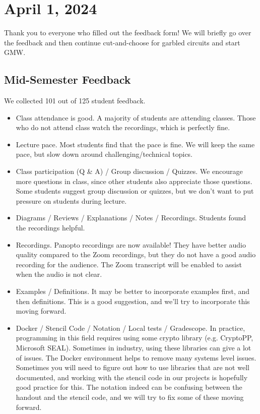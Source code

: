\section{April 1, 2024}
\label{20240401}

Thank you to everyone who filled out the feedback form! We will briefly go over the feedback and then continue cut-and-choose for garbled circuits and start GMW.

\subsection{Mid-Semester Feedback}

We collected 101 out of 125 student feedback.

\begin{itemize}
    \item Class attendance is good. A majority of students are attending classes. Those who do not attend class watch the recordings, which is perfectly fine.
    \item Lecture pace. Most students find that the pace is fine. We will keep the same pace, but slow down around challenging/technical topics.
    \item Class participation (Q \& A) / Group discussion / Quizzes. We encourage more questions in class, since other students also appreciate those questions. Some students suggest group discussion or quizzes, but we don't want to put pressure on students during lecture.
    \item Diagrams / Reviews / Explanations / Notes / Recordings. Students found the recordings helpful.
    \item Recordings. Panopto recordings are now available! They have better audio quality compared to the Zoom recordings, but they do not have a good audio recording for the audience. The Zoom transcript will be enabled to assist when the audio is not clear.
    \item Examples / Definitions. It may be better to incorporate examples first, and then definitions. This is a good suggestion, and we'll try to incorporate this moving forward.
    \item Docker / Stencil Code / Notation / Local tests / Gradescope. In practice, programming in this field requires using some crypto library (e.g. CryptoPP, Microsoft SEAL). Sometimes in industry, using these libraries can give a lot of issues. The Docker environment helps to remove many systems level issues. Sometimes you will need to figure out how to use libraries that are not well documented, and working with the stencil code in our projects is hopefully good practice for this. The notation indeed can be confusing between the handout and the stencil code, and we will try to fix some of these moving forward.

\end{itemize}
